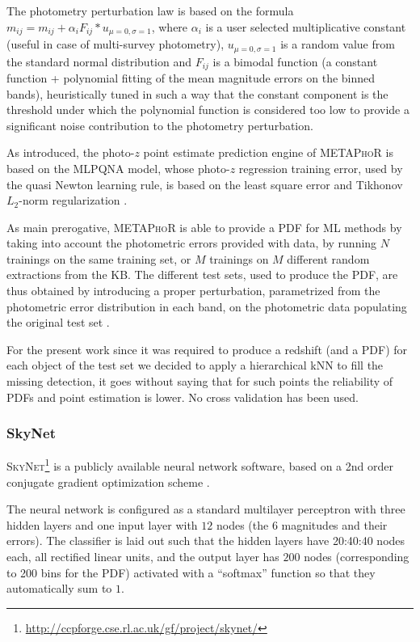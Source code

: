 The photometry perturbation law is based on the formula $m_{ij} = m_{ij} + \alpha_{i}F_{ij}*u_{\mu=0,\sigma=1}$, where $\alpha_{i}$ is a user selected multiplicative constant (useful in case of multi-survey photometry), $u_{\mu=0,\sigma=1}$ is a random value from the standard normal distribution and $F_{ij}$ is a bimodal function (a constant function + polynomial fitting of the mean magnitude errors on the binned bands), heuristically tuned in such a way that the constant component is the threshold under which the polynomial function is considered too low to provide a significant noise contribution to the photometry perturbation.

As introduced, the photo-$z$ point estimate prediction engine of \textsc{METAPhoR} is based on the MLPQNA model, whose photo-$z$ regression training error, used by the quasi Newton learning rule, is based on the least square error and Tikhonov $L_{2}$-norm regularization \citep{Hofmann:18}.

As main prerogative, \textsc{METAPhoR} is able to provide a PDF for ML methods by taking into account the photometric errors provided with data, by running $N$ trainings on the same training set, or $M$ trainings on $M$ different random extractions from the KB. The different test sets, used to produce the PDF, are thus obtained by introducing a proper perturbation, parametrized from the photometric error distribution in each band, on the photometric data populating the original test set \citep{Brescia:18}.

For the present work since it was required to produce a redshift (and a PDF) for each object of the test set we decided to apply a hierarchical kNN to fill the missing detection, it goes without saying that for such points the reliability of PDFs and point estimation is lower. No cross validation has been used.


\subsubsection{SkyNet}
\label{sec:skynet}

\textsc{SkyNet}\footnote{\url{http://ccpforge.cse.rl.ac.uk/gf/project/skynet/}} \citep{Graff:14} is a publicly available neural network software, based on a 2nd order conjugate gradient optimization scheme \citep[see][for further details]{Graff:14}. %

The neural network is configured as a standard multilayer perceptron with three hidden layers and one input layer with $12$ nodes (the $6$ magnitudes and their errors).
The classifier is laid out such that the hidden layers have 20:40:40 nodes each, all rectified linear units, and the output layer has $200$ nodes (corresponding to 200 bins for the PDF) activated with a ``softmax'' function so that they automatically sum to $1$.

